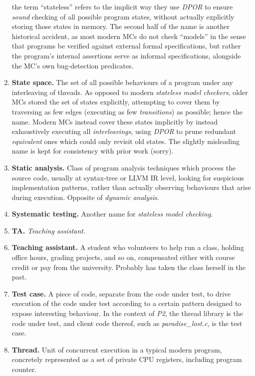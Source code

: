 \begin{enumerate}
		the term ``stateless'' refers to the implicit way they use {\em DPOR} to ensure {\em sound} checking
		of all possible program states, without actually explicitly storing those states in memory.
		The second half of the name is another historical accident,
		as most modern MCs do not check ``models'' in the sense that
		programs be verified against external formal specifications,
		but rather the program's internal assertions serve as informal specifications,
		alongside the MC's own bug-detection predicates.
	\item {\bf State space.}
		The set of all possible behaviours of a program under any interleaving of threads.
		As opposed to modern {\em stateless model checkers}, older MCs stored the set of states explicitly,
		attempting to cover them by traversing as few edges (executing as few {\em transitions}) as possible;
		hence the name.
		Modern MCs instead cover these states implicitly by instead exhaustively executing all {\em interleavings},
		using {\em DPOR} to prune redundant {\em equivalent} ones which could only revisit old states.
		The slightly misleading name is kept for consistency with prior work (sorry).
	\item {\bf Static analysis.}
		Class of program analysis techniques which process the source code,
		usually at syntax-tree or LLVM IR level,
		looking for suspicious implementation patterns,
		rather than actually observing behaviours that arise during execution.
		Opposite of {\em dynamic analysis}.
	\item {\bf Systematic testing.}
		Another name for {\em stateless model checking}.
	\item {\bf TA.} {\em Teaching assistant}.
	\item {\bf Teaching assistant.}
		A student who volunteers to help run a class, holding office hours, grading projects, and so on,
		compensated either with course credit or pay from the university.
		Probably has taken the class herself in the past.
	\item {\bf Test case.}
		A piece of code, separate from the code under test,
		to drive execution of the code under test according to a certain pattern designed to expose interesting behaviour.
		In the context of {\em P2}, the thread library is the code under test,
		and client code thereof, such as {\em paradise\_lost.c}, is the test case.
	\item {\bf Thread.}
		Unit of concurrent execution in a typical modern program,
		concretely represented as a set of private CPU registers, including program counter.

\end{enumerate}

